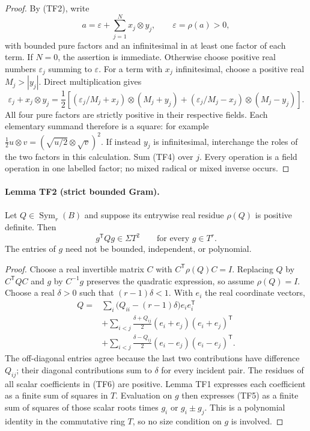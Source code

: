 \begin{proof}
By (TF2), write
\[
 a=\varepsilon+\sum_{j=1}^N x_j\otimes y_j,\qquad
 \varepsilon=\rho(a)>0,
 \tag{TF3}
\]
with bounded pure factors and an infinitesimal in at least one factor
of each term. If $N=0$, the assertion is immediate. Otherwise choose
positive real numbers $\varepsilon_j$ summing to $\varepsilon$.
For a term with $x_j$ infinitesimal, choose a positive real
$M_j>|y_j|$. Direct multiplication gives
\[
 \varepsilon_j+x_j\otimes y_j
 =\frac12\left[
  (\varepsilon_j/M_j+x_j)\otimes(M_j+y_j)
 +(\varepsilon_j/M_j-x_j)\otimes(M_j-y_j)\right].
 \tag{TF4}
\]
All four pure factors are strictly positive in their respective
fields. Each elementary summand therefore is a square: for example
$\tfrac12u\otimes v=(\sqrt{u/2}\otimes\sqrt v)^2$.
If instead $y_j$ is infinitesimal, interchange the roles of the
two factors in this calculation. Sum (TF4) over $j$. Every operation
is a field operation in one labelled factor; no mixed radical or
mixed inverse occurs.
\end{proof}

\label{p25af2c58da7e:lem:gram}
\paragraph{Lemma TF2 (strict bounded Gram).}
Let $Q\in\operatorname{Sym}_r(B)$ and suppose its entrywise real
residue $\rho(Q)$ is positive definite. Then
\[
                 g^{\mathsf T}Qg\in\Sigma T^2
                 \qquad\text{for every }g\in T^r.
 \tag{TF5}
\]
The entries of $g$ need not be bounded, independent, or polynomial.

\begin{proof}
Choose a real invertible matrix $C$ with
$C^{\mathsf T}\rho(Q)C=I$. Replacing $Q$ by
$C^{\mathsf T}QC$ and $g$ by $C^{-1}g$ preserves the quadratic
expression, so assume $\rho(Q)=I$. Choose a real $\delta>0$ such
that $(r-1)\delta<1$. With $e_i$ the real coordinate vectors,
\[
\begin{split}
 Q={}&\sum_i\bigl(Q_{ii}-(r-1)\delta\bigr)e_ie_i^{\mathsf T}\\
 &+\sum_{i<j}\frac{\delta+Q_{ij}}2
                (e_i+e_j)(e_i+e_j)^{\mathsf T}\\
 &+\sum_{i<j}\frac{\delta-Q_{ij}}2
                (e_i-e_j)(e_i-e_j)^{\mathsf T}.
\end{split}
 \tag{TF6}
\]
The off-diagonal entries agree because the last two contributions
have difference $Q_{ij}$; their diagonal contributions sum to
$\delta$ for every incident pair. The residues of all scalar
coefficients in (TF6) are positive. Lemma TF1 expresses each
coefficient as a finite sum of squares in $T$. Evaluation on $g$
then expresses (TF5) as a finite sum of squares of those scalar roots
times $g_i$ or $g_i\pm g_j$. This is a polynomial identity in the
commutative ring $T$, so no size condition on $g$ is involved.
\end{proof}

